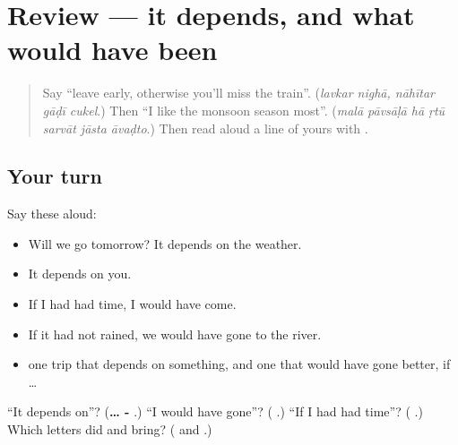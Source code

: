 \section[(review)]{Review — it depends, and what would have been}

\label{lesson:MR-R287-depends-and-would}



\begin{quote}
Say \textquotedblleft{}leave early, otherwise you'll miss the train\textquotedblright{}. (\emph{lavkar nighā, nāhītar gāḍī cukel}.) Then \textquotedblleft{}I like the monsoon season most\textquotedblright{}. (\emph{malā pāvsāḷā hā ṛtū sarvāt jāsta āvaḍto}.) Then read aloud a line of yours with \textbf{}.
\end{quote}

\subsection*{Your turn}
Say these aloud:

\begin{itemize}
\raggedright
  \item Will we go tomorrow? It depends on the weather.
  \item It depends on you.
  \item If I had had time, I would have come.
  \item If it had not rained, we would have gone to the river.
  \item one trip that depends on something, and one that would have gone better, if …
\end{itemize}

\begin{tcolorbox}[breakable,colback=teal!4,colframe=teal!35!black,title={Before you move on}]
\textquotedblleft{}It depends on\textquotedblright{}? (\textbf{… -  }.) \textquotedblleft{}I would have gone\textquotedblright{}? (\textbf{  }.) \textquotedblleft{}If I had had time\textquotedblright{}? (\textbf{   }.) Which letters did \textbf{} and \textbf{} bring? (\textbf{} and \textbf{}.)
\end{tcolorbox}
